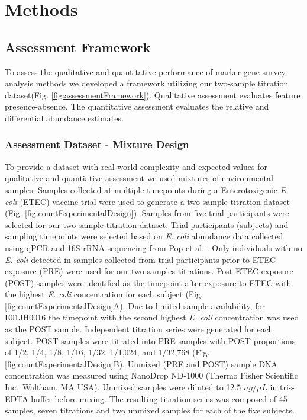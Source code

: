 \documentclass{bmcart}
\begin{document}



\section*{Methods}

\subsection*{Assessment Framework}
To assess the qualitative and quantitative performance of marker-gene survey analysis methods we developed a framework utilizing our two-sample titration dataset(Fig. \ref{fig:assessmentFramework}).
Qualitative assessment evaluates feature presence-absence.
The quantitative assessment evaluates the relative and differential abundance estimates.

\subsubsection*{Assessment Dataset - Mixture Design}
To provide a dataset with real-world complexity and expected values for  qualitative and quantiative assessment we used mixtures of environmental samples.
Samples collected at multiple timepoints during a Enterotoxigenic
\emph{E. coli} (ETEC) vaccine trial \cite{harro2011refinement} were
used to generate a two-sample titration dataset (Fig.
\ref{fig:countExperimentalDesign}). Samples from five trial
participants were selected for our two-sample titration dataset. Trial
participants (subjects) and sampling timepoints were selected based on
\emph{E. coli} abundance data collected using qPCR and 16S rRNA
sequencing from Pop et al. \cite{pop2016individual}. Only individuals with no
\emph{E. coli} detected in samples collected from trial participants
prior to ETEC exposure (PRE) were used for our two-samples titrations.
Post ETEC exposure (POST) samples were identified as the timepoint after
exposure to ETEC with the highest \emph{E. coli} concentration for each
subject (Fig. \ref{fig:countExperimentalDesign}A). Due to limited sample
availability, for E01JH0016 the timepoint with the second highest
\emph{E. coli} concentration was used as the POST sample. Independent
titration series were generated for each subject. POST samples
were titrated into PRE samples with POST proportions of 1/2, 1/4, 1/8,
1/16, 1/32, 1/1,024, and 1/32,768 (Fig.
\ref{fig:countExperimentalDesign}B). Unmixed (PRE and POST) sample DNA
concentration was measured using NanoDrop ND-1000 (Thermo Fisher
Scientific Inc.~Waltham, MA USA). Unmixed samples were diluted to 12.5
\(ng/\mu L\) in tris-EDTA buffer before mixing. The resulting titration series
was composed of 45 samples, seven titrations and two unmixed samples for each
of the five subjects.
\end{document}
